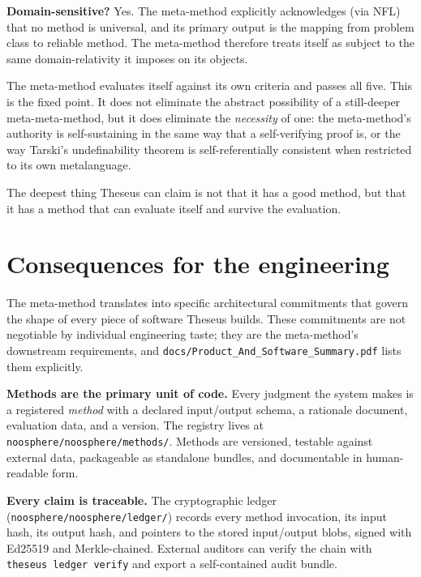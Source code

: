 \documentclass[11pt,letterpaper]{article}
\newcommand{\file}[1]{\texttt{#1}}
\begin{document}
\textbf{Domain-sensitive?} Yes. The meta-method explicitly acknowledges (via NFL) that no method is universal, and its primary output is the mapping from problem class to reliable method. The meta-method therefore treats itself as subject to the same domain-relativity it imposes on its objects.

The meta-method evaluates itself against its own criteria and passes all five. This is the fixed point. It does not eliminate the abstract possibility of a still-deeper meta-meta-method, but it does eliminate the \emph{necessity} of one: the meta-method's authority is self-sustaining in the same way that a self-verifying proof is, or the way Tarski's undefinability theorem is self-referentially consistent when restricted to its own metalanguage.

The deepest thing Theseus can claim is not that it has a good method, but that it has a method that can evaluate itself and survive the evaluation.

\section{Consequences for the engineering}

The meta-method translates into specific architectural commitments that govern the shape of every piece of software Theseus builds. These commitments are not negotiable by individual engineering taste; they are the meta-method's downstream requirements, and \file{docs/Product\_And\_Software\_Summary.pdf} lists them explicitly.

\textbf{Methods are the primary unit of code.} Every judgment the system makes is a registered \emph{method} with a declared input/output schema, a rationale document, evaluation data, and a version. The registry lives at \file{noosphere/noosphere/methods/}. Methods are versioned, testable against external data, packageable as standalone bundles, and documentable in human-readable form.

\textbf{Every claim is traceable.} The cryptographic ledger (\file{noosphere/noosphere/ledger/}) records every method invocation, its input hash, its output hash, and pointers to the stored input/output blobs, signed with Ed25519 and Merkle-chained. External auditors can verify the chain with \texttt{theseus ledger verify} and export a self-contained audit bundle.
\end{document}
